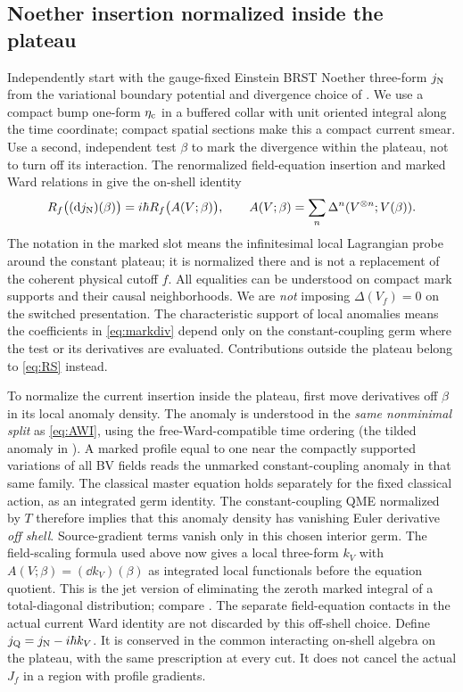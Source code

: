 \subsection{Noether insertion normalized inside the plateau}

Independently start with the gauge-fixed Einstein BRST Noether three-form \(j_{\rm N}\) from the variational boundary potential and divergence choice of \cite[App.~B]{BFR}. We use a compact bump one-form \(\eta_{\rm c}\) in a buffered collar with unit oriented integral along the time coordinate; compact spatial sections make this a compact current smear. Use a second, independent test \(\beta\) to mark the divergence within the plateau, not to turn off its interaction. The renormalized field-equation insertion and marked Ward relations in \cite[Eqs.~(40), (43), (67), (70)]{Rejzner} give the on-shell identity
\begin{equation}
    R_f\bigl((\mathrm d j_{\rm N})(\beta)\bigr)
       = i\hbar R_f\bigl(A(V;\beta)\bigr),\qquad
    A(V;\beta)=\sum_{n}\Delta^{n}(V^{\otimes n};V(\beta)).
    \label{eq:markdiv}
\end{equation}
The notation in the marked slot means the infinitesimal local Lagrangian probe around the constant plateau; it is normalized there and is not a replacement of the coherent physical cutoff \(f\). All equalities can be understood on compact mark supports and their causal neighborhoods. We are \emph{not} imposing \(\Delta(V_f)=0\) on the switched presentation. The characteristic support of local anomalies means the coefficients in \eqref{eq:markdiv} depend only on the constant-coupling germ where the test or its derivatives are evaluated. Contributions outside the plateau belong to \eqref{eq:RS} instead.

To normalize the current insertion inside the plateau, first move derivatives off \(\beta\) in its local anomaly density. The anomaly is understood in the \emph{same nonminimal split} as \eqref{eq:AWI}, using the free-Ward-compatible time ordering (the tilded anomaly in \cite[Sec.~3.4, Eq.~(65)]{Rejzner}). A marked profile equal to one near the compactly supported variations of all BV fields reads the unmarked constant-coupling anomaly in that same family. The classical master equation holds separately for the fixed classical action, as an integrated germ identity. The constant-coupling QME normalized by \(T\) therefore implies that this anomaly density has vanishing Euler derivative \emph{off shell}. Source-gradient terms vanish only in this chosen interior germ. The field-scaling formula used above now gives a local three-form \(k_V\) with \(A(V;\beta)=(\dd k_V)(\beta)\) as integrated local functionals before the equation quotient. This is the jet version of eliminating the zeroth marked integral of a total-diagonal distribution; compare \cite[Sec.~4.6, Lemma~9]{Hollands}. The separate field-equation contacts in the actual current Ward identity are not discarded by this off-shell choice. Define \(j_{\rm Q}=j_{\rm N}-i\hbar k_V\). It is conserved in the common interacting on-shell algebra on the plateau, with the same prescription at every cut. It does not cancel the actual \(J_f\) in a region with profile gradients.

